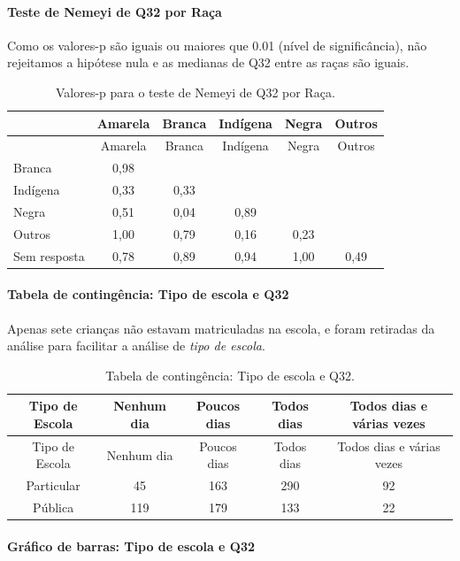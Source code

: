 \documentclass[]{article}
\let\oldparagraph\paragraph
\renewcommand{\paragraph}[1]{\oldparagraph{#1}\mbox{}}
\begin{document}
\hypertarget{teste-de-nemeyi-de-q32-por-rauxe7a}{%
\paragraph{Teste de Nemeyi de Q32 por Raça}\label{teste-de-nemeyi-de-q32-por-rauxe7a}}

Como os valores-p são iguais ou maiores que 0.01 (nível de significância), não rejeitamos a hipótese nula e as medianas de Q32 entre as raças são iguais.

\begin{longtable}[]{@{}lccccc@{}}
\caption{\label{tab:unnamed-chunk-1113}Valores-p para o teste de Nemeyi de Q32 por Raça.}\tabularnewline
\toprule
& Amarela & Branca & Indígena & Negra & Outros\tabularnewline
\midrule
\endfirsthead
\toprule
& Amarela & Branca & Indígena & Negra & Outros\tabularnewline
\midrule
\endhead
Branca & 0,98 & & & &\tabularnewline
Indígena & 0,33 & 0,33 & & &\tabularnewline
Negra & 0,51 & 0,04 & 0,89 & &\tabularnewline
Outros & 1,00 & 0,79 & 0,16 & 0,23 &\tabularnewline
Sem resposta & 0,78 & 0,89 & 0,94 & 1,00 & 0,49\tabularnewline
\bottomrule
\end{longtable}

\cleardoublepage

\hypertarget{tabela-de-continguxeancia-tipo-de-escola-e-q32}{%
\paragraph{Tabela de contingência: Tipo de escola e Q32}\label{tabela-de-continguxeancia-tipo-de-escola-e-q32}}

Apenas sete crianças não estavam matriculadas na escola, e foram retiradas da análise para facilitar a análise de \emph{tipo de escola}.

\begin{longtable}[]{@{}ccccc@{}}
\caption{\label{tab:unnamed-chunk-1114}Tabela de contingência: Tipo de escola e Q32.}\tabularnewline
\toprule
Tipo de Escola & Nenhum dia & Poucos dias & Todos dias & Todos dias e várias vezes\tabularnewline
\midrule
\endfirsthead
\toprule
Tipo de Escola & Nenhum dia & Poucos dias & Todos dias & Todos dias e várias vezes\tabularnewline
\midrule
\endhead
Particular & 45 & 163 & 290 & 92\tabularnewline
Pública & 119 & 179 & 133 & 22\tabularnewline
\bottomrule
\end{longtable}

\hypertarget{gruxe1fico-de-barras-tipo-de-escola-e-q32}{%
\paragraph{Gráfico de barras: Tipo de escola e Q32}\label{gruxe1fico-de-barras-tipo-de-escola-e-q32}}
\end{document}
